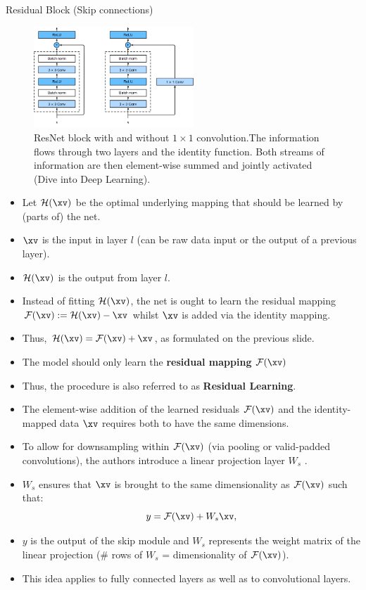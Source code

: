 \begin{vbframe}{Residual Block (Skip connections)}
  \begin{figure}
  \centering
    \includegraphics[width=6cm]{plots/moderncnn/resnet-block.png}
    \caption{ResNet block with and without $1 \times 1$ convolution.The information flows through two layers and the identity function. Both streams of information are then element-wise summed and jointly activated (Dive into Deep Learning).}
  \end{figure}

\framebreak
    \begin{itemize}
        \item Let $\mathcal{H}(\xv)$ be the optimal underlying mapping that should be learned by (parts of) the net.
        \item $\xv$ is the input in layer $l$ (can be raw data input or the output of a previous layer).
        \item $\mathcal{H}(\xv)$ is the output from layer $l$.
        \item Instead of fitting $\mathcal{H}(\xv)$, the net is ought to learn the residual mapping $\mathcal{F}(\xv):=\mathcal{H}(\xv)-\xv$ whilst $\xv$ is added via the identity mapping.
        \item Thus, $\mathcal{H}(\xv) = \mathcal{F}(\xv) + \xv$, as formulated on the previous slide.
        \item The model should only learn the \textbf{residual mapping} $\mathcal{F}(\xv)$ 
        \item Thus, the procedure is also referred to as \textbf{Residual Learning}.
    \end{itemize}
\framebreak
    \begin{itemize}
        \item The element-wise addition of the learned residuals $\mathcal{F}(\xv)$ and the identity-mapped data $\xv$ requires both to have the same dimensions.
        \item To allow for downsampling within $\mathcal{F}(\xv)$ (via pooling or valid-padded convolutions), the authors introduce a linear projection layer $W_s$ .
        \item $W_s$ ensures that $\xv$ is brought to the same dimensionality as $\mathcal{F}(\xv)$ such that:
        $$
            y = \mathcal{F}(\xv) + W_s\xv,
        $$
        \item $y$ is the output of the skip module and $W_s$ represents the weight matrix of the linear projection (\# rows of $W_s$ = dimensionality of $\mathcal{F}(\xv)$).
        \item This idea applies to fully connected layers as well as to convolutional layers.
    \end{itemize}
\end{vbframe}

